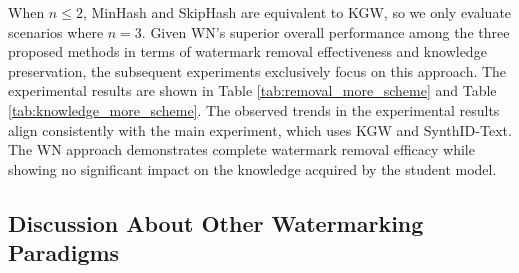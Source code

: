\vspace{3pt}

When $n \leq 2$, MinHash and SkipHash are equivalent to KGW, so we only evaluate scenarios where $n=3$. Given WN's superior overall performance among the three proposed methods in terms of watermark removal effectiveness and knowledge preservation, the subsequent experiments exclusively focus on this approach. The experimental results are shown in Table \ref{tab:removal_more_scheme} and Table \ref{tab:knowledge_more_scheme}. The observed trends in the experimental results align consistently with the main experiment, which uses KGW and SynthID-Text. The WN approach demonstrates complete watermark removal efficacy while showing no significant impact on the knowledge acquired by the student model.

\subsection{Discussion About Other Watermarking Paradigms}
\label{sec:more_para}
